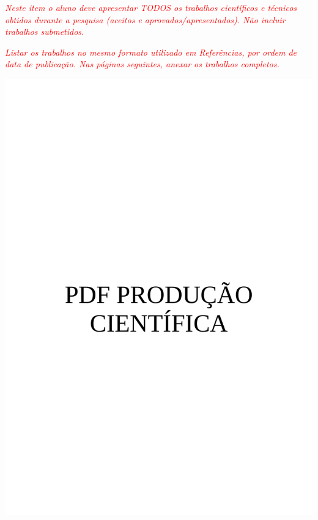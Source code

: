 \begin{producaotecnicacientifica}

\textit{\textcolor{red}{Neste item o aluno deve apresentar TODOS os trabalhos científicos e técnicos obtidos durante a pesquisa (aceitos e aprovados/apresentados). Não incluir trabalhos submetidos.}}

\textit{\textcolor{red}{Listar os trabalhos no mesmo formato utilizado em Referências, por ordem de data de publicação. Nas páginas seguintes, anexar os trabalhos completos.}}

\includegraphics[page=1, trim= 1.8in 0in 0in 0.7in, width=1\textwidth ]{./artigos/exemplo.pdf}
\newpage

\end{producaotecnicacientifica}

